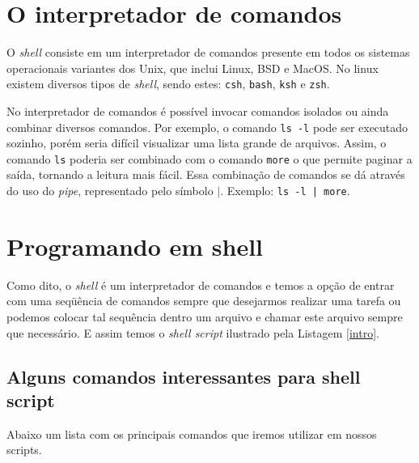 \documentclass[11pt]{article}
\begin{document}

\shell

\section{O interpretador de comandos}

O \textit{shell} consiste em um interpretador de comandos presente em todos os sistemas operacionais variantes dos Unix, que inclui Linux, BSD e MacOS. No linux existem diversos tipos de \textit{shell}, sendo estes: \texttt{csh}, \texttt{bash}, \texttt{ksh} e \texttt{zsh}. 

No interpretador de comandos é possível invocar comandos isolados ou ainda combinar diversos comandos. Por exemplo, o comando \texttt{ls -l} pode ser executado sozinho, porém seria difícil visualizar uma lista grande de arquivos. Assim, o comando \texttt{ls} poderia ser combinado com o comando \texttt{more} o que permite paginar a saída, tornando a leitura mais fácil. Essa combinação de comandos se dá através do uso do \textit{pipe}, representado pelo símbolo $|$. Exemplo: \texttt{ls -l | more}.

\section{Programando em shell}

Como dito, o \textit{shell} é um interpretador de comandos e temos a opção de entrar com uma seqüência de comandos sempre que desejarmos realizar uma tarefa ou podemos colocar tal sequência dentro um arquivo e chamar este arquivo sempre que necessário. E assim temos o \textit{shell script} ilustrado pela Listagem \ref{intro}.


\subsection{Alguns comandos interessantes para shell script}

Abaixo um lista com os principais comandos que iremos utilizar em nossos scripts.
\end{document}
